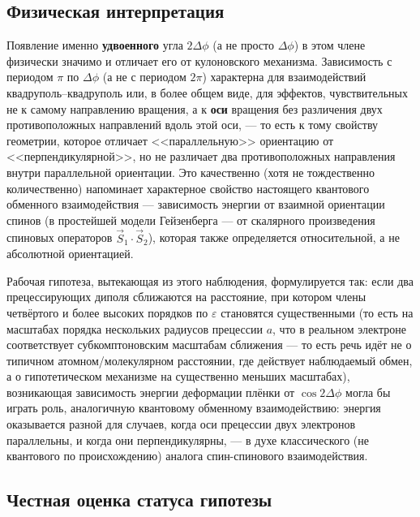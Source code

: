 \documentclass[12pt,a4paper]{article}
\begin{document}
\subsection{Физическая интерпретация}

Появление именно \textbf{удвоенного} угла $2\Delta\phi$ (а не просто
$\Delta\phi$) в этом члене физически значимо и отличает его от
кулоновского механизма. Зависимость с периодом $\pi$ по $\Delta\phi$
(а не с периодом $2\pi$) характерна для взаимодействий квадруполь--квадруполь
или, в более общем виде, для эффектов, чувствительных не к самому
направлению вращения, а к \textbf{оси} вращения без различения двух
противоположных направлений вдоль этой оси, --- то есть к тому
свойству геометрии, которое отличает <<параллельную>> ориентацию от
<<перпендикулярной>>, но не различает два противоположных направления
внутри параллельной ориентации. Это качественно (хотя не тождественно
количественно) напоминает характерное свойство настоящего квантового
обменного взаимодействия --- зависимость энергии от взаимной
ориентации спинов (в простейшей модели Гейзенберга --- от скалярного
произведения спиновых операторов $\vec S_1\cdot\vec S_2$), которая
также определяется относительной, а не абсолютной ориентацией.

Рабочая гипотеза, вытекающая из этого наблюдения, формулируется так:
если два прецессирующих диполя сближаются на расстояние, при котором
члены четвёртого и более высоких порядков по $\varepsilon$ становятся
существенными (то есть на масштабах порядка нескольких радиусов
прецессии $a$, что в реальном электроне соответствует
субкомптоновским масштабам сближения --- то есть речь идёт не о
типичном атомном/молекулярном расстоянии, где действует наблюдаемый
обмен, а о гипотетическом механизме на существенно меньших
масштабах), возникающая зависимость энергии деформации плёнки от
$\cos2\Delta\phi$ могла бы играть роль, аналогичную квантовому
обменному взаимодействию: энергия оказывается разной для случаев,
когда оси прецессии двух электронов параллельны, и когда они
перпендикулярны, --- в духе классического (не квантового по
происхождению) аналога спин-спинового взаимодействия.

\subsection{Честная оценка статуса гипотезы}
\end{document}
